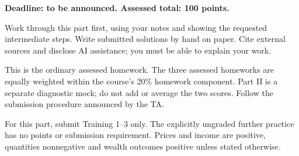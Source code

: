 \textbf{Deadline: to be announced. Assessed total: 100 points.}

Work through this part first, using your notes and showing the requested
intermediate steps. Write submitted solutions by hand on paper. Cite external
sources and disclose AI assistance; you must be able to explain your work.

This is the ordinary assessed homework. The three assessed homeworks are
equally weighted within the course's 20\% homework component. Part II is a
separate diagnostic mock; do not add or average the two scores. Follow the
submission procedure announced by the TA.

For this part, submit Training 1--3 only. The explicitly ungraded further
practice has no points or submission requirement. Prices and income are
positive, quantities nonnegative and wealth outcomes positive unless stated otherwise.
